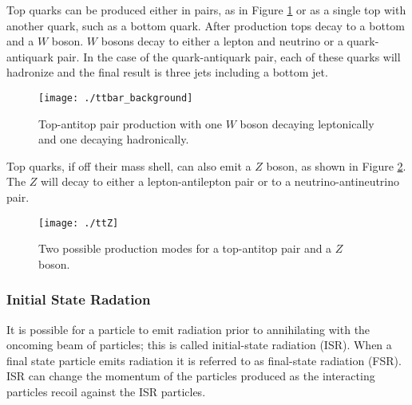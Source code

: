 Top quarks can be produced either in pairs, as in Figure \ref{fig:ttbarfeynman} or as a single top with another quark, such as a bottom quark.  After production tops decay to a bottom and a $W$ boson.  $W$ bosons decay to either a lepton and neutrino or a quark-antiquark pair.  In the case of the quark-antiquark pair, each of these quarks will hadronize and the final result is three jets including a bottom jet.  \\

\begin{figure}[h!]
  \centering
	\texttt{[image: ./ttbar\_background]}
\caption{\label{fig:ttbarfeynman}{ Top-antitop pair production with one $W$ boson decaying leptonically and one decaying hadronically. }} 
\end{figure}

Top quarks, if off their mass shell, can also emit a $Z$ boson, as shown in Figure \ref{fig:ttz}.  The $Z$ will decay to either a lepton-antilepton pair or to a neutrino-antineutrino pair.  \\

\begin{figure}[h!]
  \centering
	\texttt{[image: ./ttZ]}
\caption{\label{fig:ttz}{ Two possible production modes for a top-antitop pair and a $Z$ boson. }} 
\end{figure}


	
		
		\subsubsection{Initial State Radation}
		It is possible for a particle to emit radiation prior to annihilating with the oncoming beam of particles; this is called initial-state radiation (ISR).  When a final state particle emits radiation it is referred to as final-state radiation (FSR).  \\ 
		
		ISR can change the momentum of the particles produced as the interacting particles recoil against the ISR particles.   \\
		

